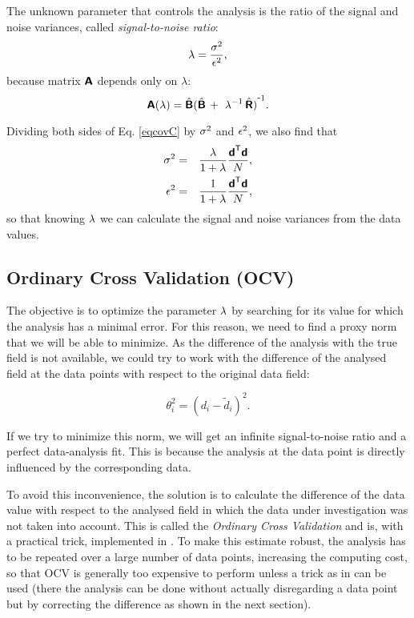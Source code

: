 The unknown parameter that controls the analysis is the ratio of the signal and noise variances, called \textit{signal-to-noise ratio}:
\begin{equation}
\lambda=\frac{\sigma^2}{\epsilon^2},
\end{equation}
because matrix $\mbox{\boldmath $ \protect\mathsf{A} $}$ depends only on $\lambda$:
\begin{equation}
\mbox{\boldmath $ \protect\mathsf{A} $}(\lambda)=\hat{\mbox{\boldmath $ \protect\mathsf{B} $}} {(\hat{\mbox{\boldmath $ \protect\mathsf{B} $}}\, + \,\, \lambda^{-1} \, \hat{\mbox{\boldmath $ \protect\mathsf{R} $}})}^{ \mbox{\small{-}} 1}.
\end{equation}


Dividing both sides of Eq. \eqref{eqcovC} by $\sigma^{2}$ and  $\epsilon^{2}$, we also find that
\begin{eqnarray}
\sigma^2 &=& \frac{\lambda}{1 + \lambda} \frac{ {\mbox{\boldmath $ \protect\mathsf{d} $}}^\mathsf{T} \mbox{\boldmath $ \protect\mathsf{d} $}}{N},\label{eq:signalsnr}\\
\epsilon^2 &=& \frac{1 }{ 1 + \lambda} \frac{ {\mbox{\boldmath $ \protect\mathsf{d} $}}^\mathsf{T} \mbox{\boldmath $ \protect\mathsf{d} $} }{ N},\label{eq:noisesnr}
\end{eqnarray}
so that knowing $\lambda$ we can calculate the signal and noise variances from the data values.

\subsection{Ordinary Cross Validation (OCV)}

The objective is to optimize the parameter $\lambda$ by searching for its value for which the analysis has a minimal error. For this reason, we need to find a proxy norm that we will be able to minimize. As the difference of the analysis with the true field is not available, we could try to work with the difference of the analysed field at the data points with respect to the original data field:

\begin{equation}
{\theta_i^2} = {(d_i - \tilde{d}_i)^2}.
\end{equation}

If we try to minimize this norm, we will get an infinite signal-to-noise ratio and a perfect data-analysis fit. This is because the analysis at the data point is directly influenced by the corresponding data. 

To avoid this inconvenience, the solution is to calculate the difference of the data value with respect to the analysed field in which the data under investigation was not taken into account. This is called the \textit{Ordinary Cross Validation} and is, with a practical trick, implemented in . To make this estimate robust, the analysis has to be repeated over a large number of data points, increasing the computing cost, so that OCV is generally too expensive to perform unless a trick as in  can be used (there the analysis can be done without actually disregarding a data point but by correcting the difference as shown in the next section).

